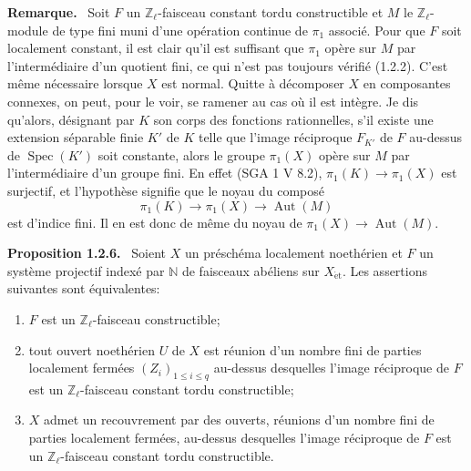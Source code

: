 \documentclass[11pt]{article}
\newenvironment{statement}[1]{\par\medskip\noindent\textbf{#1.}\ }{\par\medskip}
\DeclareMathOperator{\Spec}{Spec}
\providecommand{\Aut}{\operatorname{Aut}}
\providecommand{\Spec}{\operatorname{Spec}}
\providecommand{\Spec}{\operatorname{Spec}}
\providecommand{\Aut}{\operatorname{Aut}}
\providecommand{\Spec}{\operatorname{Spec}}
\providecommand{\Spec}{\operatorname{Spec}}
\begin{document}
\begin{statement}{Remarque}
Soit \(F\) un \(\mathbb Z_\ell\)-faisceau constant tordu constructible et \(M\) le \(\mathbb Z_\ell\)-module de type fini muni d'une opération continue de \(\pi_1\) associé. Pour que \(F\) soit localement constant, il est clair qu'il est suffisant que \(\pi_1\) opère sur \(M\) par l'intermédiaire d'un quotient fini, ce qui n'est pas toujours vérifié (1.2.2). C'est même nécessaire lorsque \(X\) est normal. Quitte à décomposer \(X\) en composantes connexes, on peut, pour le voir, se ramener au cas où il est intègre. Je dis qu'alors, désignant par \(K\) son corps des fonctions rationnelles, s'il existe une extension séparable finie \(K'\) de \(K\) telle que l'image réciproque \(F_{K'}\) de \(F\) au-dessus de \(\Spec(K')\) soit constante, alors le groupe \(\pi_1(X)\) opère sur \(M\) par l'intermédiaire d'un groupe fini. En effet (SGA 1 V 8.2), \(\pi_1(K)\to \pi_1(X)\) est surjectif, et l'hypothèse signifie que le noyau du composé
\[
\pi_1(K)\longrightarrow \pi_1(X)\longrightarrow \Aut(M)
\]
est d'indice fini. Il en est donc de même du noyau de \(\pi_1(X)\to\Aut(M)\).
\end{statement}

\begin{statement}{Proposition 1.2.6}
Soient \(X\) un préschéma localement noethérien et \(F\) un système projectif indexé par \(\mathbb N\) de faisceaux abéliens sur \(X_{\mathrm{\acute et}}\). Les assertions suivantes sont équivalentes:
\begin{enumerate}[label=(\roman*)]
\item \(F\) est un \(\mathbb Z_\ell\)-faisceau constructible;
\item tout ouvert noethérien \(U\) de \(X\) est réunion d'un nombre fini de parties localement fermées \((Z_i)_{1\le i\le q}\) au-dessus desquelles l'image réciproque de \(F\) est un \(\mathbb Z_\ell\)-faisceau constant tordu constructible;
\item \(X\) admet un recouvrement par des ouverts, réunions d'un nombre fini de parties localement fermées, au-dessus desquelles l'image réciproque de \(F\) est un \(\mathbb Z_\ell\)-faisceau constant tordu constructible.
\end{enumerate}
\end{statement}
\end{document}
